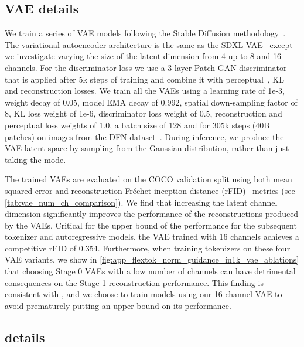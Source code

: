 \subsection{VAE details}
\label{sec:app_vae_training_details}
We train a series of VAE models following the Stable Diffusion methodology~\cite{rombach2022high}. The variational autoencoder architecture is the same as the SDXL VAE~\cite{Podell2023SDXL} except we investigate varying the size of the latent dimension from 4 up to 8 and 16 channels. For the discriminator loss we use a 3-layer Patch-GAN discriminator~\cite{isola2017image} that is applied after 5k steps of training and combine it with perceptual~\cite{dosovitskiy2016generating}, KL and reconstruction losses. We train all the VAEs using a learning rate of 1e-3, weight decay of 0.05, model EMA decay of 0.992, spatial down-sampling factor of 8, KL loss weight of 1e-6, discriminator loss weight of 0.5, reconstruction and perceptual loss weights of 1.0, a batch size of 128 and for 305k steps (40B patches) on images from the DFN dataset~\cite{dfn_dataset}. During inference, we produce the VAE latent space by sampling from the Gaussian distribution, rather than just taking the mode.

The trained VAEs are evaluated on the COCO validation split using both mean squared error and reconstruction Fréchet inception distance (rFID)~\cite{Heusel2017FID} metrics (see \cref{tab:vae_num_ch_comparison}). We find that increasing the latent channel dimension significantly improves the performance of the reconstructions produced by the VAEs. Critical for the upper bound of the performance for the subsequent tokenizer and autoregressive models, the VAE trained with 16 channels achieves a competitive rFID of 0.354. Furthermore, when training \oursbase tokenizers on these four VAE variants, we show in \cref{fig:app_flextok_norm_guidance_in1k_vae_ablations} that choosing Stage 0 VAEs with a low number of channels can have detrimental consequences on the Stage 1 \ours reconstruction performance. This finding is consistent with \citet{Esser2024SD3}, and we choose to train \ours models using our 16-channel VAE to avoid prematurely putting an upper-bound on its performance.


\subsection{\ours details}
\label{sec:app_resampler_training_details}

